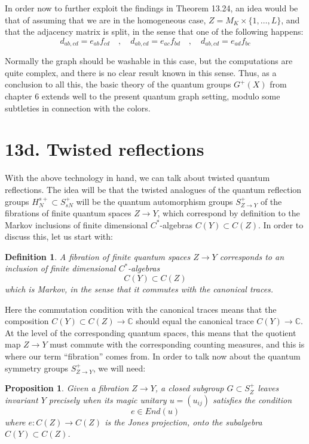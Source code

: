 \documentclass[12pt]{amsbook}
\newtheorem{definition}[theorem]{Definition}
\newtheorem{proposition}[theorem]{Proposition}
\begin{document}
In order now to further exploit the findings in Theorem 13.24, an idea would be that of assuming that we are in the homogeneous case, $Z=M_K\times\{1,\ldots,L\}$, and that the adjacency matrix is split, in the sense that one of the following happens:
$$d_{ab,cd}=e_{ab}f_{cd}\quad,\quad
d_{ab,cd}=e_{ac}f_{bd}\quad,\quad 
d_{ab,cd}=e_{ad}f_{bc}$$

Normally the graph should be washable in this case, but the computations are quite complex, and there is no clear result known in this sense. Thus, as a conclusion to all this, the basic theory of the quantum groups $G^+(X)$ from chapter 6 extends well to the present quantum graph setting, modulo some subtleties in connection with the colors. 

\section*{13d. Twisted reflections}

With the above technology in hand, we can talk about twisted quantum reflections. The idea will be that the twisted analogues of the quantum reflection groups $H_N^{s+}\subset S_{sN}^+$ will be the quantum automorphism groups $S_{Z\to Y}^+$ of the fibrations of finite quantum spaces $Z\to Y$, which correspond by definition to the Markov inclusions of finite dimensional $C^*$-algebras $C(Y)\subset C(Z)$. In order to discuss this, let us start with:

\begin{definition}
A fibration of finite quantum spaces $Z\to Y$ corresponds to an inclusion of finite dimensional $C^*$-algebras
$$C(Y)\subset C(Z)$$
which is Markov, in the sense that it commutes with the canonical traces.
\end{definition}  

Here the commutation condition with the canonical traces means that the composition $C(Y)\subset C(Z)\to\mathbb C$ should equal the canonical trace $C(Y)\to\mathbb C$. At the level of the corresponding quantum spaces, this means that the quotient map $Z\to Y$ must commute with the corresponding counting measures, and this is where our term ``fibration'' comes from. In order to talk now about the quantum symmetry groups $S_{Z\to Y}^+$, we will need:

\begin{proposition}
Given a fibration $Z\to Y$, a closed subgroup $G\subset S_Z^+$ leaves invariant $Y$ precisely when its magic unitary $u=(u_{ij})$ satisfies the condition
$$e\in End(u)$$
where $e:C(Z)\to C(Z)$ is the Jones projection, onto the subalgebra $C(Y)\subset C(Z)$.
\end{proposition}
\end{document}
